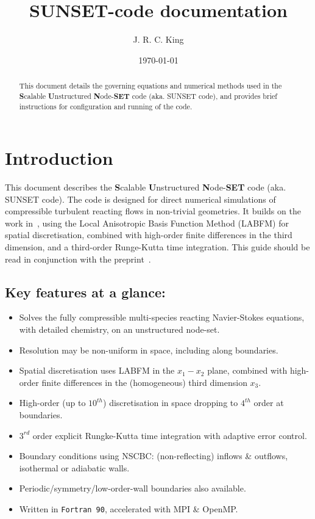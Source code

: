\documentclass[notitlepage]{revtex4-1}
\begin{document}
\title{SUNSET-code documentation}

\author{J. R. C. King}
\date{\today}
\begin{abstract}
This document details the governing equations and numerical methods used in the \textbf{S}calable \textbf{U}nstructured \textbf{N}ode-\textbf{SET} code (aka. SUNSET code), and provides brief instructions for configuration and running of the code.

\end{abstract}

\maketitle

\section{Introduction}

This document describes the \textbf{S}calable \textbf{U}nstructured \textbf{N}ode-\textbf{SET} code (aka. SUNSET code). The code is designed for direct numerical simulations of compressible turbulent reacting flows in non-trivial geometries. It builds on the work in~\cite{king_2020,king_2022}, using the Local Anisotropic Basis Function Method (LABFM) for spatial discretisation, combined with high-order finite differences in the third dimension, and a third-order Runge-Kutta time integration. This guide should be read in conjunction with the preprint~\cite{king_2024}.

\subsection{Key features at a glance:}
\begin{itemize}
\item Solves the fully compressible multi-species reacting Navier-Stokes equations, with detailed chemistry, on an unstructured node-set.
\item Resolution may be non-uniform in space, including along boundaries.
\item Spatial discretisation uses LABFM in the $x_{1}-x_{2}$ plane, combined with high-order finite differences in the (homogeneous) third dimension $x_{3}$.
\item High-order (up to $10^{th}$) discretisation in space dropping to $4^{th}$ order at boundaries.
\item $3^{rd}$ order explicit Rungke-Kutta time integration with adaptive error control.
\item Boundary conditions using NSCBC: (non-reflecting) inflows \& outflows, isothermal or adiabatic walls.
\item Periodic/symmetry/low-order-wall boundaries also available.
\item Written in \verb|Fortran 90|, accelerated with MPI \& OpenMP.
\end{itemize}
\end{document}
